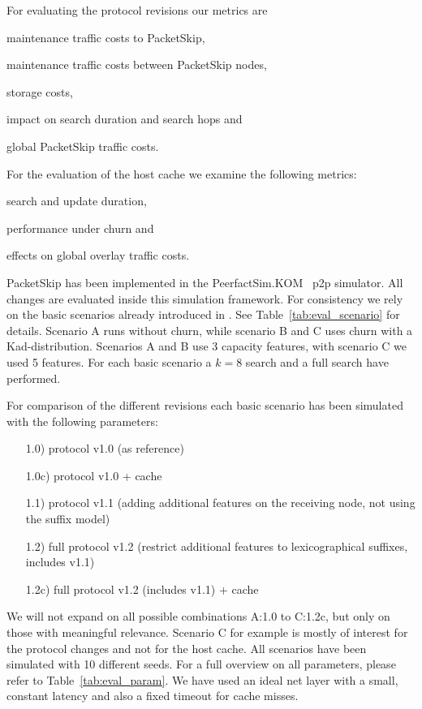 For evaluating the protocol revisions our metrics are 
\begin{inparaenum}[i)]
  \item maintenance traffic costs to PacketSkip,
  \item maintenance traffic costs between PacketSkip nodes,
  \item storage costs,
  \item impact on search duration and search hops and
  \item global PacketSkip traffic costs.
\end{inparaenum}
For the evaluation of the host cache we examine the following metrics:
\begin{inparaenum}[i)]
  \item search and update duration,
  \item performance under churn and
  \item effects on global overlay traffic costs.
\end{inparaenum}

PacketSkip has been implemented in the PeerfactSim.KOM~\cite{peerfactsim} p2p simulator. All changes are evaluated inside this simulation framework. For consistency we rely on the basic scenarios already introduced in \cite{packetskip10}. See Table~\ref{tab:eval_scenario} for details. Scenario A runs without churn, while scenario B and C uses churn with a Kad-distribution. Scenarios A and B use 3 capacity features, with scenario C we used 5 features. For each basic scenario a $k=8$ search and a full search have performed.

For comparison of the different revisions each basic scenario has been simulated with the following parameters:

\begin{enumerate}
  \item[1.0)] protocol v1.0 (as reference)
  \item[1.0c)] protocol v1.0 + cache
  \item[1.1)] protocol v1.1 (adding additional features on the receiving node, not using the suffix model)
  \item[1.2)] full protocol v1.2 (restrict additional features to lexicographical suffixes, includes v1.1)
  \item[1.2c)] full protocol v1.2 (includes v1.1) + cache
\end{enumerate}

We will not expand on all possible combinations A:1.0 to C:1.2c, but only on those with meaningful relevance. Scenario C for example is mostly of interest for the protocol changes and not for the host cache. All scenarios have been simulated with 10 different seeds. For a full overview on all parameters, please refer to Table~\ref{tab:eval_param}. We have used an ideal net layer with a small, constant latency and also a fixed timeout for cache misses.







